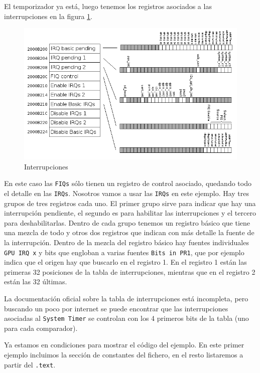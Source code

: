 El temporizador ya está, luego tenemos los registros asociados a las interrupciones en la figura
\ref{fig:interrupciones}.

\begin{figure}[h]
  \centering
    \includegraphics[width=14cm]{graphs/interrupciones.png}
  \caption{Interrupciones}
  \label{fig:interrupciones}
\end{figure}

En este caso las {\tt FIQs} sólo tienen un registro de control asociado, quedando todo el detalle
en las {\tt IRQs}. Nosotros vamos a usar las {\tt IRQs} en este ejemplo. Hay tres grupos de tres
registros cada uno. El primer grupo sirve para indicar que hay una interrupción pendiente, el
segundo es para habilitar las interrupciones y el tercero para deshabilitarlas. Dentro de cada
grupo tenemos un registro básico que tiene una mezcla de todo y otros dos registros que
indican con más detalle la fuente de la interrupción. Dentro de la mezcla del registro básico
hay fuentes individuales {\tt GPU IRQ x} y bits que engloban a varias fuentes {\tt Bits in PR1},
que por ejemplo indica que el origen hay que buscarlo en el registro 1. En el registro 1 están
las primeras 32 posiciones de la tabla de interrupciones, mientras que en el registro 2 están
las 32 últimas.

La documentación oficial sobre la tabla de interrupciones está incompleta, pero buscando un poco
por internet se puede encontrar que las interrupciones asociadas al {\tt System Timer} se
controlan con los 4 primeros bits de la tabla (uno para cada comparador).

Ya estamos en condiciones para mostrar el código del ejemplo. En este primer ejemplo incluimos
la sección de constantes del fichero, en el resto listaremos a partir del {\tt .text}.

